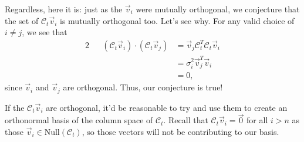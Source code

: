 \documentclass[letterpaper]{article}
\theoremstyle{remark}
\newcommand{\Null}[1]{\text{Null}(#1)}
\newcommand{\eqn}[1]{\begin{alignat*}{2}#1\end{alignat*}}
\begin{document}
Regardless, here it is: just as the $\vec{v}_i$ were mutually orthogonal, we conjecture that the set of $\mathscr{C}_t\vec{v}_i$ is mutually orthogonal too. Let's see why. For any valid choice of $i \ne j$, we see that
\eqn{
    && (\mathscr{C}_t\vec{v}_i) \cdot (\mathscr{C}_t\vec{v}_j) &= \vec{v}_j\mathscr{C}_t^T\mathscr{C}_t\vec{v}_i \\
    &&&= \sigma_i^2 \vec{v}_j^T\vec{v}_i \\
    &&&= 0,
}
since $\vec{v}_i$ and $\vec{v}_j$ are orthogonal. Thus, our conjecture is true!

If the $\mathscr{C}_t\vec{v}_i$ are orthogonal, it'd be reasonable to try and use them to create an orthonormal basis of the column space of $\mathscr{C}_t$. Recall that $\mathscr{C}_t\vec{v}_i = \vec{0}$ for all $i > n$ as those $\vec{v}_i \in \Null{\mathscr{C}_t}$, so those vectors will not be contributing to our basis. 
\end{document}
